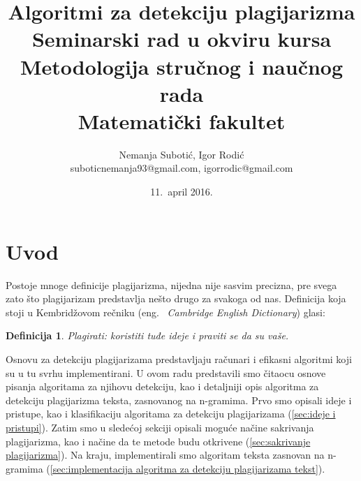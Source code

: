 \documentclass[a4paper]{article}
\newtheorem{definicija}{Definicija}[section]
\begin{document}
\title{Algoritmi za detekciju plagijarizma \\ \small{Seminarski rad u okviru kursa\\Metodologija stručnog i naučnog rada\\ Matematički fakultet}}

\author{Nemanja Subotić, Igor Rodić \\ suboticnemanja93@gmail.com, igorrodic@gmail.com}
\date{11.~april 2016.}
\maketitle


\tableofcontents

\newpage

\section{Uvod}
\label{sec:uvod}

Postoje mnoge definicije plagijarizma, nijedna nije sasvim precizna, pre svega zato što plagijarizam predstavlja nešto drugo za svakoga od nas. Definicija koja stoji u Kembridžovom rečniku (eng. ~{\em Cambridge English Dictionary}) glasi:
\begin{definicija}
Plagirati: koristiti tuđe ideje i praviti se da su vaše.
\end{definicija}
Osnovu za detekciju plagijarizama predstavljaju računari i efikasni algoritmi koji su u tu svrhu implementirani. U ovom radu predstavili smo čitaocu osnove pisanja algoritama za njihovu detekciju, kao i detaljniji opis algoritma za detekciju plagijarizma teksta, zasnovanog na n-gramima. Prvo smo opisali ideje i pristupe, kao i klasifikaciju algoritama za detekciju plagijarizama (\ref{sec:ideje i pristupi}). Zatim smo u sledećoj sekciji opisali moguće načine sakrivanja plagijarizma, kao i načine da te metode budu otkrivene (\ref{sec:sakrivanje plagijarizma}). Na kraju, implementirali smo algoritam teksta zasnovan na n-gramima (\ref{sec:implementacija algoritma za detekciju plagijarizama tekst}).
\end{document}
